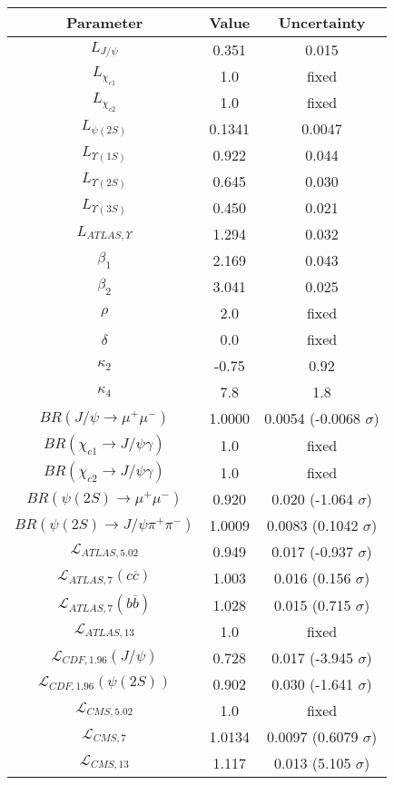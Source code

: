 \begin{table}[h!]
\centering
\begin{tabular}{c|c|c}
Parameter & Value & Uncertainty \\
\hline
$L_{J/\psi}$ & 0.351 & 0.015 \\
$L_{\chi_{c1}}$ & 1.0 & fixed \\
$L_{\chi_{c2}}$ & 1.0 & fixed \\
$L_{\psi(2S)}$ & 0.1341 & 0.0047 \\
$L_{\Upsilon(1S)}$ & 0.922 & 0.044 \\
$L_{\Upsilon(2S)}$ & 0.645 & 0.030 \\
$L_{\Upsilon(3S)}$ & 0.450 & 0.021 \\
$L_{ATLAS,\Upsilon}$ & 1.294 & 0.032 \\
$\beta_1$ & 2.169 & 0.043 \\
$\beta_2$ & 3.041 & 0.025 \\
$\rho$ & 2.0 & fixed \\
$\delta$ & 0.0 & fixed \\
$\kappa_2$ & -0.75 & 0.92 \\
$\kappa_4$ & 7.8 & 1.8 \\
$BR(J/\psi\rightarrow\mu^+\mu^-)$ & 1.0000 & 0.0054 (-0.0068 $\sigma$) \\
$BR(\chi_{c1}\rightarrow J/\psi\gamma)$ & 1.0 & fixed \\
$BR(\chi_{c2}\rightarrow J/\psi\gamma)$ & 1.0 & fixed \\
$BR(\psi(2S)\rightarrow\mu^+\mu^-)$ & 0.920 & 0.020 (-1.064 $\sigma$) \\
$BR(\psi(2S)\rightarrow J/\psi\pi^+\pi^-)$ & 1.0009 & 0.0083 (0.1042 $\sigma$) \\
$\mathcal L_{ATLAS,5.02}$ & 0.949 & 0.017 (-0.937 $\sigma$) \\
$\mathcal L_{ATLAS,7}(c\overline c)$ & 1.003 & 0.016 (0.156 $\sigma$) \\
$\mathcal L_{ATLAS,7}(b\overline b)$ & 1.028 & 0.015 (0.715 $\sigma$) \\
$\mathcal L_{ATLAS,13}$ & 1.0 & fixed \\
$\mathcal L_{CDF,1.96}(J/\psi)$ & 0.728 & 0.017 (-3.945 $\sigma$) \\
$\mathcal L_{CDF,1.96}(\psi(2S))$ & 0.902 & 0.030 (-1.641 $\sigma$) \\
$\mathcal L_{CMS,5.02}$ & 1.0 & fixed \\
$\mathcal L_{CMS,7}$ & 1.0134 & 0.0097 (0.6079 $\sigma$) \\
$\mathcal L_{CMS,13}$ & 1.117 & 0.013 (5.105 $\sigma$) \\

\end{tabular}
\end{table}
